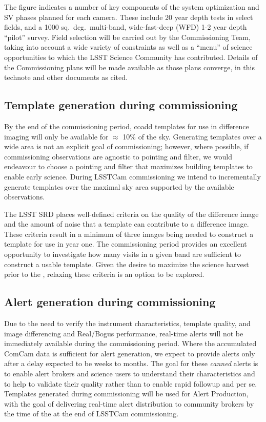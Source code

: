The figure indicates a number of key components of the system optimization and SV phases planned for each camera.
These include 20 year depth tests in select fields, and a 1000 sq.\ deg.\, multi-band, wide-fast-deep (WFD) 1-2 year depth ``pilot'' survey.
Field selection will be carried out by the Commissioning Team, taking into account a wide variety of constraints as well as a ``menu'' of science opportunities to which the LSST Science Community has contributed.
Details of the Commissioning plans will be made available as those plans converge, in this technote and other documents as cited.


\subsection{Template generation during commissioning}

By the end of the commissioning period, coadd templates for use in difference imaging will only be available for $\approx$ 10\% of the sky.
Generating templates over a wide area is not an explicit goal of commissioning;  however, where possible, if commissioning observations are agnostic to pointing and filter, we would endeavour to choose a pointing and filter that maximizes building templates to enable early science.
During LSSTCam commissioning we intend to incrementally generate templates over the maximal sky area supported by the available observations.

The LSST SRD places well-defined criteria on the quality of the difference image and the amount of noise that a template can contribute to a difference image.
These criteria result in a minimum of three images being needed to construct a template for use in year one.
The commissioning period provides an excellent opportunity to investigate how many visits in a given band are sufficient to construct a usable template.
Given the desire to maximize the science harvest prior to the \drone,  relaxing these criteria is an option to be explored.

\subsection{Alert generation during commissioning}

Due to the need to verify the instrument characteristics, template quality, and image differencing and Real/Bogus performance, real-time alerts will not be immediately available during the commissioning period.
Where the accumulated ComCam data is sufficient for alert generation, we expect to provide alerts only after a delay expected to be weeks to months. 
The goal for these {\it canned} alerts is to enable alert brokers and science users to understand their characteristics and to help to validate their quality rather than to enable rapid followup and \es per se.
Templates generated during commissioning will be used for Alert Production, with the goal of delivering real-time alert distribution to community brokers by the time of the \svs at the end of LSSTCam commissioning.

